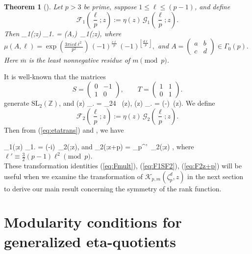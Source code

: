 \documentclass[12pt]{amsart}
\newtheorem{theorem}{Theorem}[section]
\theoremstyle{definition}
\theoremstyle{remark}
\numberwithin{equation}{section}
\newcommand{\SL}{\mbox{SL}}
\newcommand\Lpar[1]{\left(#1\right)}
\newcommand\Fell[4]{\mathcal{F}_{#1}\left(\frac{#2}{#3};#4\right)}
\newcommand\Gell[4]{\mathcal{G}_{#1}\left(\frac{#2}{#3};#4\right)}
\newcommand\AMat{\begin{pmatrix} a & b \\ c & d \end{pmatrix}}
\newcommand\SMat{\begin{pmatrix} 0 & -1 \\ 1 & 0 \end{pmatrix}}
\newcommand\TMat{\begin{pmatrix} 1 & 1 \\ 0 & 1 \end{pmatrix}}
\newcommand\FL[1]{\left\lfloor#1\right\rfloor}
\newcommand\stroke[3]{#1\,\left\arrowvert\,\left[#2\right]_{#3}\right.}
\newcommand\eqn[1]{(\ref{eq:#1})}
\begin{document}
\begin{theorem}[{\cite[Theorem 4.1, p.218]{Ga19a}}]
\label{thm:mainthm}
Let $p>3$ be prime, suppose $1\le\ell\le(p-1)$, and define
\begin{equation}
\Fell{1}{\ell}{p}{z} := \eta(z) \, \Gell{1}{\ell}{p}{z}.
\label{eq:F1def}
\end{equation}
Then
\beq
\stroke{\Fell{1}{\ell}{p}{z}}{A}{1} = \mu(A,\ell)\,
\Fell{1}{\overline{d\ell}}{p}{z},
\label{eq:Fmult}
\eeq
where
$\mu(A,\ell) = \exp\left(\frac{3\pi i c d \ell^2}{p^2}\right) \,(-1)^{\frac{c\ell}{p}} \, (-1)^{\FL{\frac{d\ell}{p}}},$
and
$A = \AMat \in \Gamma_0(p).$
\\
Here $\overline{m}$ is the least nonnegative residue of $m\pmod{p}$.\\
\end{theorem}
It is well-known that the matrices
$$
S=\SMat,\qquad T=\TMat.
$$
generate $\SL_2(\mathbb{Z})$, and
\beq
\stroke{\eta(z)}{T}{} = \zeta_{24} \, \eta(z),\qquad
\stroke{\eta(z)}{S}{} = \exp\Lpar{-}\, \eta(z).
\label{eq:etatrans}
\eeq
We define
\begin{equation}
\Fell{2}{\ell}{p}{z} := \eta(z) \, \Gell{2}{\ell}{p}{z}.
\label{eq:F2def}
\end{equation}
Then from \eqn{etatrans} and \cite[Theorem 4.5, p.220]{Ga19a}, we have

\beq
\stroke{\Fell{1}{\ell}{p}{z}}{S}{1} = (-i)\, \Fell{2}{\ell}{p}{z},
\label{eq:F1SF2}
\eeq
and
\beq
\Fell{2}{\ell}{p}{z+p} = \zeta_p^{\ell'}\, \Fell{2}{\ell}{p}{z} ,
\label{eq:F2z+p}
\eeq
where $\ell' \equiv  \frac{3}{2}(p-1)\ell^2\pmod{p}$. \\

These transformation identities \eqn{Fmult}, \eqn{F1SF2}, \eqn{F2z+p} will be useful when we examine the transformation of $\mathcal{K}_{p,m}(\zeta_p^d,z)$ in the next section to derive our main result concerning the symmetry of the rank function.\\








\section{Modularity conditions for generalized eta-quotients}
\end{document}
